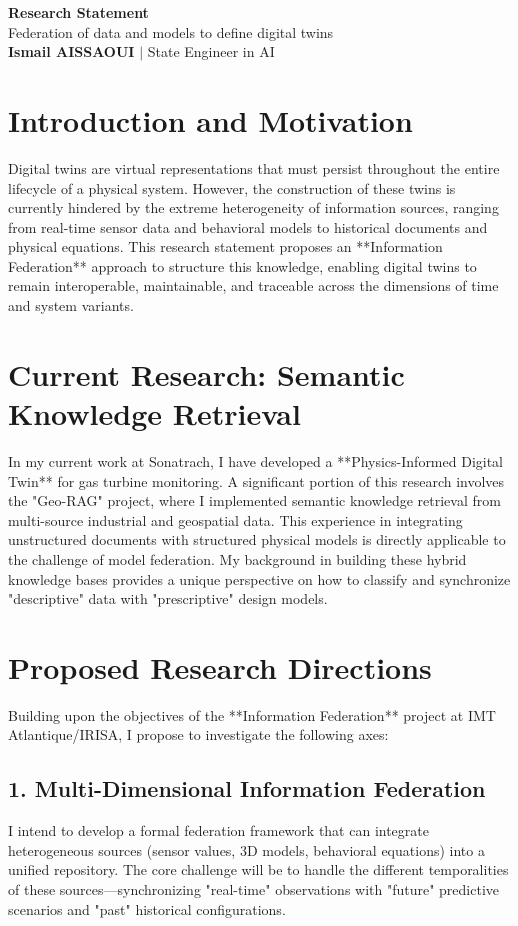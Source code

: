 \documentclass[a4paper,11pt]{article}
\begin{document}
\begin{center}
    {\LARGE\bfseries\color{titleblue} Research Statement}\\[6pt]
    {\large Federation of data and models to define digital twins}\\[4pt]
    \textbf{Ismail AISSAOUI} $|$ State Engineer in AI
\end{center}

\bigskip

\section{Introduction and Motivation}
Digital twins are virtual representations that must persist throughout the entire lifecycle of a physical system. However, the construction of these twins is currently hindered by the extreme heterogeneity of information sources, ranging from real-time sensor data and behavioral models to historical documents and physical equations. This research statement proposes an **Information Federation** approach to structure this knowledge, enabling digital twins to remain interoperable, maintainable, and traceable across the dimensions of time and system variants.

\section{Current Research: Semantic Knowledge Retrieval}
In my current work at Sonatrach, I have developed a **Physics-Informed Digital Twin** for gas turbine monitoring. A significant portion of this research involves the "Geo-RAG" project, where I implemented semantic knowledge retrieval from multi-source industrial and geospatial data. This experience in integrating unstructured documents with structured physical models is directly applicable to the challenge of model federation. My background in building these hybrid knowledge bases provides a unique perspective on how to classify and synchronize "descriptive" data with "prescriptive" design models.

\section{Proposed Research Directions}
Building upon the objectives of the **Information Federation** project at IMT Atlantique/IRISA, I propose to investigate the following axes:

\subsection{1. Multi-Dimensional Information Federation}
I intend to develop a formal federation framework that can integrate heterogeneous sources (sensor values, 3D models, behavioral equations) into a unified repository. The core challenge will be to handle the different temporalities of these sources—synchronizing "real-time" observations with "future" predictive scenarios and "past" historical configurations.
\end{document}
